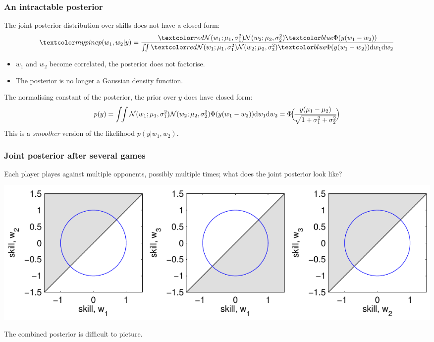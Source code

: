 \begin{frame}
\frametitle{An intractable posterior}

The joint posterior distribution over skills does not have a closed form:
\[
\Green{p(w_1,w_2|y)} = \frac{\Red{\N(w_1; \mu_1, \sigma_1^2)\N(w_2; \mu_2, \sigma_2^2)}
\Blue{\Phi(y(w_1-w_2))}}
{\int\!\!\int \Red{\N(w_1; \mu_1, \sigma_1^2)\N(w_2; \mu_2, \sigma_2^2)}
\Blue{\Phi(y(w_1-w_2))}\mathrm{d}w_1\mathrm{d}w_2}
\]

\begin{itemize}
\item $w_1$ and $w_2$ become correlated, the posterior does not factorise.
\item The posterior is no longer a Gaussian density function.
\end{itemize}
The normalising constant of the posterior, the prior over $y$ does have closed form:
\[
p(y) = \int\!\!\int \mathcal{N}(w_1; \mu_1, \sigma_1^2)\mathcal{N}(w_2; \mu_2, \sigma_2^2)
\Phi(y(w_1-w_2))\mathrm{d}w_1\mathrm{d}w_2 = 
\Phi\!\Big(\!\frac{y(\mu_1-\mu_2)}{\sqrt{1+\sigma_1^2+\sigma_2^2}}\!\Big)
\]
This is a \emph{smoother} version of the likelihood $p(y|w_1,w_2)$.\\
\hfill{}
\end{frame}


\begin{frame}
\frametitle{Joint posterior after several games}

Each player playes against multiple opponents, possibly multiple
times; what does the joint posterior look like?

\centerline{\includegraphics[width=\textwidth]{jp}}

The combined posterior is difficult to picture.

\hfill{}

\hfill{}
\end{frame}


